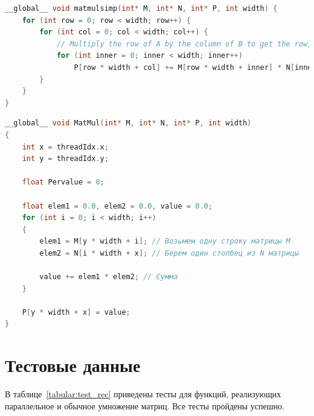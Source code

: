 \documentclass[12pt]{report}
\begin{document}
\begin{lstlisting}[label=some-code,caption=Функция умножения матриц обычным способом, language=C]
__global__ void matmulsimp(int* M, int* N, int* P, int width) {
	for (int row = 0; row < width; row++) {
		for (int col = 0; col < width; col++) {
			// Multiply the row of A by the column of B to get the row, column of product.
			for (int inner = 0; inner < width; inner++)
				P[row * width + col] += M[row * width + inner] * N[inner * width + col];
		}
	}
}
\end{lstlisting}
\newpage
\begin{lstlisting}[label=some-code,caption=Функция умножения матриц параллельно,language=C]
__global__ void MatMul(int* M, int* N, int* P, int width)
{
	int x = threadIdx.x;
	int y = threadIdx.y;

	float Pervalue = 0;

	float elem1 = 0.0, elem2 = 0.0, value = 0.0;
	for (int i = 0; i < width; i++)
	{
		elem1 = M[y * width + i]; // Возьмем одну строку матрицы M
		elem2 = N[i * width + x]; // Берем один столбец из N матрицы

		value += elem1 * elem2; // Сумма
	}

	P[y * width + x] = value;
}
\end{lstlisting}

\section{Тестовые данные}

В таблице~\ref{tabular:test_rec} приведены тесты для функций, реализующих параллельное и обычное умножение матриц. Все тесты пройдены успешно.
\end{document}
